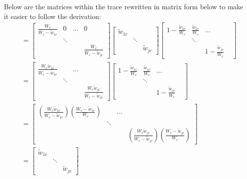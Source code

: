 Below are the matrices within the trace rewritten in matrix form below to make it easier to follow the derivation: 
\begin{equation}
    \begin{split}
        & = \begin{bmatrix}
            \frac{W_c}{W_c-\tilde{w}_{1c}} & 0 & \dots & 0 \\
            & \ddots & & \\
            & & &  \frac{W_c}{W_c-\tilde{w}_{jc} } 
        \end{bmatrix} \begin{bmatrix}
            \tilde{w}_{1c} & & \\
            & \ddots & \\
            & & \tilde{w}_{jc}
        \end{bmatrix} \begin{bmatrix}
            1- \frac{\tilde{w}_{1c} }{W_c} & \frac{\tilde{w}_{1c} }{W_c} & \dots   \\
            &  \ddots &  & \\
            & & 1- \frac{\tilde{w}_{jc} }{W_c} 
        \end{bmatrix} \\
        & = \begin{bmatrix}
            \frac{W_c\tilde{w}_{1c} }{W_c-\tilde{w}_{1c} } &  & \dots & \\
            & \ddots & & \\
            & & &  \frac{W_c \tilde{w}_{jc} }{W_c-\tilde{w}_{jc} } 
        \end{bmatrix}  \begin{bmatrix}
            1- \frac{\tilde{w}_{1c} }{W_c} & \frac{\tilde{w}_{1c} }{W_c} & \dots   \\
            &  \ddots &  & \\
            & & 1- \frac{\tilde{w}_{jc} }{W_c} 
        \end{bmatrix} \\
         & = \begin{bmatrix}
            \left(\frac{W_c\tilde{w}_{1c} }{W_c-\tilde{w}_{1c} }\right)\left(\frac{W_c-\tilde{w}_{1c} }{W_c}\right) &  & \dots & \\
            & \ddots & & \\
            & & &  \left(\frac{W_c\tilde{w}_{jc} }{W_c-\tilde{w}_{jc} }\right)\left(\frac{W_c-\tilde{w}_{jc} }{W_c}\right) 
        \end{bmatrix}   \\
        & = \begin{bmatrix}
            \tilde{w}_{1c} & & \\
            & \ddots & \\
            & & \tilde{w}_{jc}
        \end{bmatrix}  
    \end{split}
    \nonumber
\end{equation}
